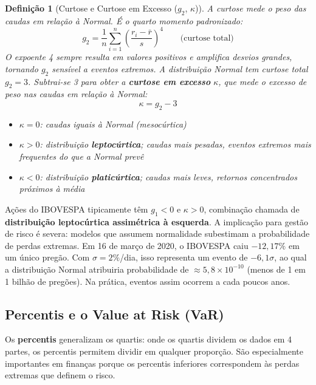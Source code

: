 \documentclass[11pt,a4paper]{article}
\theoremstyle{quant}
\newtheorem{definicao}{Definição}[section]
\begin{document}
\begin{definicao}[Curtose e Curtose em Excesso ($g_2$, $\kappa$)]
A curtose mede o peso das caudas em relação à Normal.
É o quarto momento padronizado:
\[
  g_2 = \frac{1}{n}\sum_{i=1}^{n}\left(\frac{r_i - \bar{r}}{s}\right)^{\!4}
  \qquad \text{(curtose total)}
\]
O expoente 4 sempre resulta em valores positivos e amplifica desvios grandes,
tornando $g_2$ sensível a eventos extremos. A distribuição Normal tem
curtose total $g_2 = 3$. Subtrai-se 3 para obter a \textbf{curtose em excesso}
$\kappa$, que mede o excesso de peso nas caudas em relação à Normal:
\[
  \kappa = g_2 - 3
\]
\begin{itemize}
  \item $\kappa = 0$: caudas iguais à Normal (\emph{mesocúrtica})
  \item $\kappa > 0$: distribuição \textbf{leptocúrtica}; caudas mais pesadas, eventos extremos
        mais frequentes do que a Normal prevê
  \item $\kappa < 0$: distribuição \textbf{platicúrtica}; caudas mais leves, retornos
        concentrados próximos à média
\end{itemize}
\end{definicao}

\begin{caixainsight}
Ações do IBOVESPA tipicamente têm $g_1 < 0$ e $\kappa > 0$, combinação chamada de
\textbf{distribuição leptocúrtica assimétrica à esquerda}. A implicação para gestão de
risco é severa: modelos que assumem normalidade subestimam a probabilidade de perdas
extremas. Em 16 de março de 2020, o IBOVESPA caiu $-12{,}17\%$ em um único pregão.
Com $\sigma = 2\%$/dia, isso representa um evento de $-6{,}1\sigma$, ao qual a
distribuição Normal atribuiria probabilidade de $\approx 5{,}8 \times 10^{-10}$
(menos de 1 em 1 bilhão de pregões). Na prática, eventos assim ocorrem a cada
poucos anos.
\end{caixainsight}

\subsection{Percentis e o Value at Risk (VaR)}

Os \textbf{percentis} generalizam os quartis: onde os quartis dividem os dados em 4 partes,
os percentis permitem dividir em qualquer proporção. São especialmente importantes em
finanças porque os percentis inferiores correspondem às perdas extremas que definem o risco.
\end{document}
